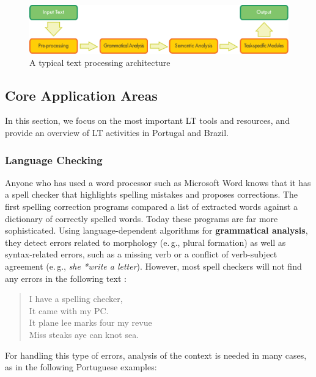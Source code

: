 \begin{multicols}{2}
\begin{figure}[htb]
  \center
  \includegraphics[width=\textwidth]{../_media/english/text_processing_app_architecture}
  \caption{A typical text processing architecture}
  \label{fig:textprocessingarch_en}
\end{figure}

\subsection{Core Application Areas}

In this section, we focus on the most important LT tools and resources, and provide an overview of LT activities in Portugal and Brazil. 

\subsubsection{Language Checking}

Anyone who has used a word processor such as Microsoft Word knows that it has a spell checker that highlights spelling mistakes and proposes corrections. The first spelling correction programs compared a list of extracted words against a dictionary of correctly spelled words. Today these programs are far more sophisticated. Using language-dependent algorithms for \textbf{grammatical analysis}, they detect errors related to morphology (e.\,g., plural formation) as well as syntax-related errors, such as a missing verb or a conflict of verb-subject agreement (e.\,g., \textit{she *write a letter}). However, most spell checkers will not find any errors in the following text \cite{zar1}:

\begin{quote}
  I have a spelling checker,\\
  It came with my PC.\\
  It plane lee marks four my revue\\
  Miss steaks aye can knot sea.
\end{quote}

 For handling this type of errors, analysis of the context is needed in many cases, as in the following Portuguese examples:\\


\end{multicols}
